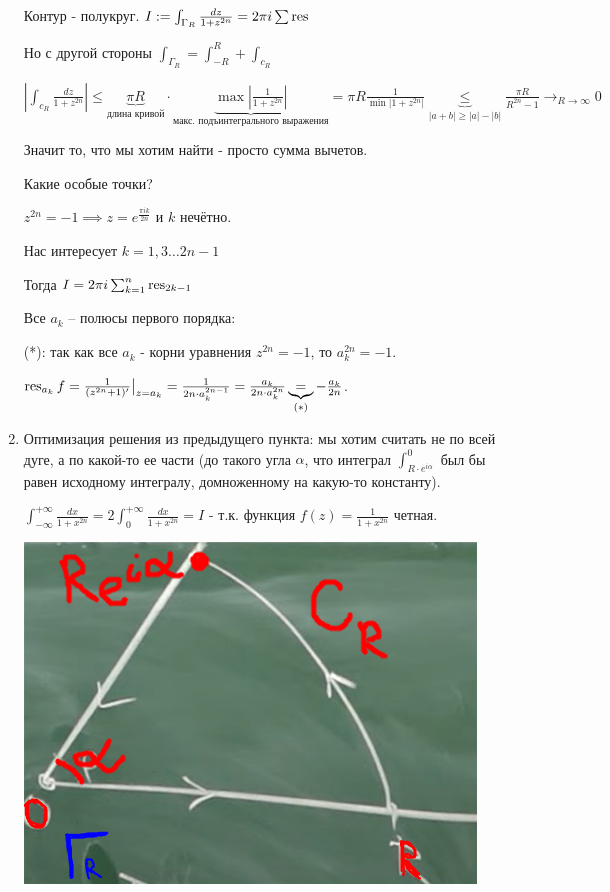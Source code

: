 \begin{example}
\begin{enumerate}
{            Контур - полукруг. $I := \int_{\Gamma_R} \frac{dz}{1 + z^{2n}} = 2 \pi i \sum \operatorname{res}$

            Но с другой стороны $\int_{\Gamma_R} = \int_{-R}^R + \int_{c_R}$

            $| \int_{c_R} \frac{dz}{1 + z^{2n}}| \leqslant \underbrace{\pi R}_{\text{длина кривой}} \cdot \underbrace{\max \left|\frac{1}{1 + z^{2n}}\right|}_{\text{макс. подъинтегрального выражения}} = \pi R \frac{1}{\min |1 + z^{2n}|}
            \underbrace{\leqslant}_{|a + b| \geqslant |a| - |b|} \frac{\pi R}{R^{2n} - 1} \rightarrow_{R \to \infty} 0$

            Значит то, что мы хотим найти - просто сумма вычетов.

            Какие особые точки?

            $z^{2n} = -1 \implies z = e^{\frac{\pi i k}{2n}}$ и $k$ нечётно.

            Нас интересует $k = 1, 3 \ldots 2n - 1$

            Тогда $I = 2 \pi i \sum_{k = 1}^n \operatorname{res}_{2k - 1}$

            Все $a_k$ -- полюсы первого порядка:

            (*): так как все $a_k$ - корни уравнения $z^{2n} = -1$, то $a_k^{2n} = -1$.

            $\operatorname{res}_{a_k} f = \frac{1}{(z^{2n} + 1)'} \big|_{z = a_k} = \frac{1}{2n \cdot a_k^{2n - 1}} = \frac{a_k}{2n\cdot a_k^{2n}} \underbrace{=}_{(*)} -\frac{a_k}{2n}$.
        }
        \item {
            Оптимизация решения из предыдущего пункта: мы хотим считать не по всей дуге, а по какой-то ее части (до такого угла $\alpha$, что интеграл $\int_{R\cdot e^{i\alpha}}^{0}$ был бы равен исходному интегралу, домноженному на какую-то константу).

            $\int_{-\infty}^{+\infty} \frac{dx}{1 + x^{2n}} = 2\int_{0}^{+\infty} \frac{dx}{1 + x^{2n}} = I$ - т.к. функция $f(z) = \frac{1}{1 + x^{2n}}$ четная.

            \begin{center}
                \includegraphics[width=12cm]{assets/04-functions-of-complex-variables/example-3-cauchy-about-deductions.png}
            \end{center}

}
\end{enumerate}
\end{example}
